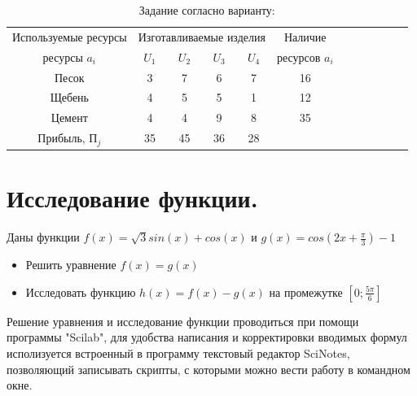 \documentclass[russian,utf8,nocolumnxxxi,nocolumnxxxii]{eskdtext}
\begin{document}
\begin{table}[h]
\caption{\label{TRT1} Задание согласно варианту:  }
\renewcommand{\tabcolsep}{0.5cm}
\begin{center}
\begin{tabular}{|c|c|c|c|c|c|c|c|c|c|c|c|}
\hline %
Используемые ресурсы &\multicolumn{4}{|c|}{Изготавливаемые изделия} & Наличие\\
ресурсы $a_i$ & $U_1$ & $U_2$ & $U_3$ & $U_4$ & ресурсов $a_i$\\

\hline
  Песок          & 3  & 7  & 6  & 7  & 16  \\
  Щебень         & 4  & 5  & 5  & 1  & 12  \\
  Цемент         & 4  & 4  & 9  & 8  & 35  \\
  Прибыль, П$_j$ & 35 & 45 & 36 & 28 &   \\
 \hline
\end{tabular}
\end{center}
\end{table} 


\newpage




\section{Исследование функции.}
\normalsize Даны функции $f(x)=\sqrt{3}sin(x)+cos(x)$ и $g(x)=cos(2x+\frac{\pi}{3})-1$
\begin{itemize}
  \item Решить уравнение $f(x)=g(x)$
  \item Исследовать функцию $h(x)=f(x)-g(x)$ на промежутке $[0;\frac{5\pi}{6}]$
\end{itemize}
\par
\normalsize Решение уравнения и исследование функции проводиться при помощи программы "Scilab", для удобства написания и корректировки вводимых формул исполизуется встроенный в программу текстовый редактор SciNotes, позволяющий записывать скрипты, с которыми можно вести работу в командном окне.
\end{document}
